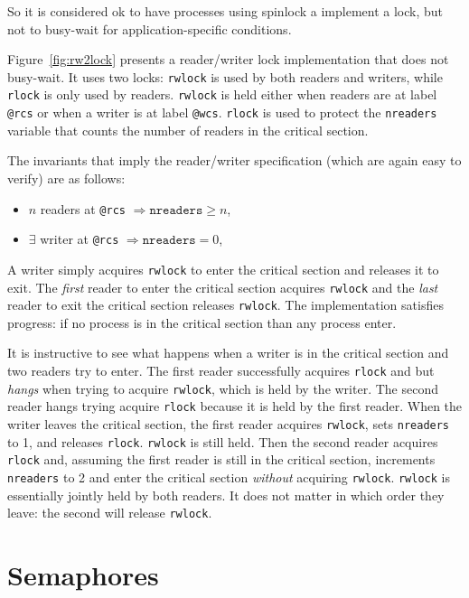 \documentclass{report}
\begin{document}
So it is considered ok to have processes using spinlock a implement a
lock, but not to busy-wait for application-specific conditions.

Figure~\ref{fig:rw2lock} presents a reader/writer lock implementation
that does not busy-wait.
It uses two locks: \texttt{rwlock} is used by both readers and writers,
while \texttt{rlock} is only used by readers.
\texttt{rwlock} is held either when readers are at label \texttt{@rcs}
or when a writer is at label \texttt{@wcs}.
\texttt{rlock} is used to protect the \texttt{nreaders} variable that
counts the number of readers in the critical section. 

The invariants that imply the reader/writer specification
(which are again easy to verify) are as follows:

\begin{itemize}
\item $n$ readers at \texttt{@rcs} $\Rightarrow \mathtt{nreaders} \ge n$,
\item $\exists$ writer at \texttt{@rcs} $\Rightarrow \mathtt{nreaders} = 0$,
\end{itemize}

A writer simply acquires \texttt{rwlock} to enter the critical section
and releases it to exit.  The \emph{first} reader to enter the critical
section acquires \texttt{rwlock} and the \emph{last} reader to exit
the critical section releases \texttt{rwlock}.
The implementation satisfies progress: if no process is in the critical
section than any process enter.

It is instructive to see what happens when a writer is in the critical
section and two readers try to enter.  The first reader successfully
acquires \texttt{rlock} and but \emph{hangs} when trying to acquire
\texttt{rwlock}, which is held by the writer.  The second reader hangs
trying acquire \texttt{rlock} because it is held by the first reader.
When the writer leaves the critical section, the first reader acquires
\texttt{rwlock}, sets \texttt{nreaders} to 1, and releases \texttt{rlock}.
\texttt{rwlock} is still held.
Then the second reader acquires \texttt{rlock} and, assuming the first
reader is still in the critical section, increments \texttt{nreaders} to 2
and enter the critical section \emph{without} acquiring \texttt{rwlock}.
\texttt{rwlock} is essentially jointly held by both readers.
It does not matter in which order they leave: the second will release
\texttt{rwlock}.

\chapter{Semaphores}
\end{document}
